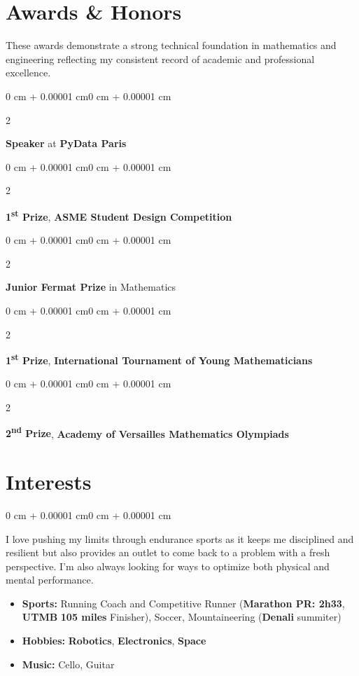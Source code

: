 \documentclass[10pt, letterpaper]{article}
\newenvironment{highlightsforbulletentries}{
    \begin{itemize}[
        topsep=0.10 cm,
        parsep=0.10 cm,
        partopsep=0pt,
        itemsep=0pt,
        leftmargin=1.5 cm
    ]
}{
    \end{itemize}
}
\newenvironment{onecolentry}{
    \begin{adjustwidth}{0 cm + 0.00001 cm}{0 cm + 0.00001 cm}
}{
    \end{adjustwidth}
}
\newenvironment{twocolentry}[2][]{
    \onecolentry
    \def\secondColumn{#2}
    \setcolumnwidth{\fill, 4.5 cm}
    \begin{paracol}{2}
}{
    \switchcolumn \raggedleft \secondColumn
    \end{paracol}
    \endonecolentry
}
\begin{document}
    \section{Awards \& Honors}
    These awards demonstrate a strong technical foundation in mathematics and engineering reflecting my consistent record of academic and professional excellence.
    \begin{twocolentry}{2015}
        \textbf{Speaker} at \textbf{PyData Paris}
    \end{twocolentry}

    \begin{twocolentry}{2012}
        \textbf{1\textsuperscript{st} Prize}, \textbf{ASME Student Design Competition}
    \end{twocolentry}

    \begin{twocolentry}{2010}
        \textbf{Junior Fermat Prize} in Mathematics
    \end{twocolentry}

    \begin{twocolentry}{2010}
        \textbf{1\textsuperscript{st} Prize}, \textbf{International Tournament of Young Mathematicians}
    \end{twocolentry}

    \begin{twocolentry}{2008}
        \textbf{2\textsuperscript{nd} Prize}, \textbf{Academy of Versailles Mathematics Olympiads}
    \end{twocolentry}

    \section{Interests}
    \begin{onecolentry}
        I love pushing my limits through endurance sports as it keeps me disciplined and resilient but also provides an outlet to come back to a problem with a fresh perspective.  I'm also always looking for ways to optimize both physical and mental performance.
        \begin{highlightsforbulletentries}
            \item \textbf{Sports:} Running Coach and Competitive Runner (\textbf{Marathon PR: 2h33}, \textbf{UTMB} \textbf{105 miles} Finisher), Soccer, Mountaineering (\textbf{Denali} summiter)
            \item \textbf{Hobbies:} \textbf{Robotics}, \textbf{Electronics}, \textbf{Space}
            \item \textbf{Music:} Cello, Guitar
        \end{highlightsforbulletentries}
    \end{onecolentry}
\end{document}

